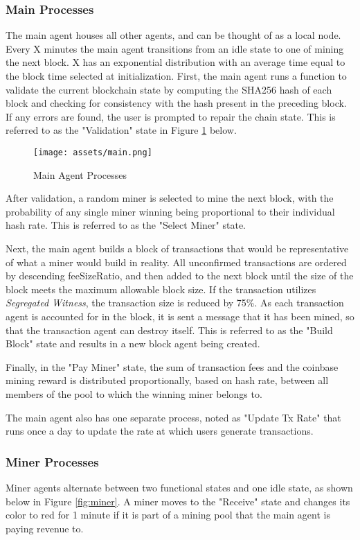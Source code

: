 \documentclass[12pt]{report}
\begin{document}
\subsubsection{Main Processes}

The main agent houses all other agents, and can be thought of as a local node. Every X minutes the main agent transitions from an idle state to one of mining the next block. X has an exponential distribution with an average time equal to the block time selected at initialization. First, the main agent runs a function to validate the current blockchain state by computing the SHA256 hash of each block and checking for  consistency with the hash present in the  preceding block. If any errors are found, the user is prompted to repair the chain state. This is referred to as the "Validation" state in Figure \ref{fig:main} below.

\begin{figure}[h!]
\texttt{[image: assets/main.png]}
\caption{Main  Agent Processes}
\label{fig:main}
\end{figure}

After validation, a random miner is selected to mine the next block, with the probability of any single miner winning being proportional to their individual hash rate. This is referred to as the "Select Miner" state.

Next, the main agent builds a block of transactions that would be representative of what a miner would build in reality. All unconfirmed transactions are ordered by descending feeSizeRatio, and then added to the next block until the size of the block meets the maximum allowable block size. If the transaction utilizes \textit{Segregated Witness}, the transaction size is reduced by 75\%. As each transaction agent is accounted for in the block, it is sent a message that it has been mined, so that the transaction agent can destroy itself. This is referred to as the "Build Block" state and results in a new block agent being created.

Finally, in the "Pay Miner" state, the sum of transaction fees and the coinbase mining reward is distributed proportionally, based on hash rate, between all members of the pool to which the winning miner belongs to.

The main agent also has one separate process, noted as "Update Tx Rate" that runs once a day to update the rate at which users generate transactions.

\subsubsection{Miner Processes}
Miner agents alternate between two functional states and one idle state, as shown below in Figure \ref{fig:miner}. A miner moves to the "Receive" state and changes its color to red for 1 minute if it is part of a mining pool that the main agent is paying revenue to.
\end{document}
